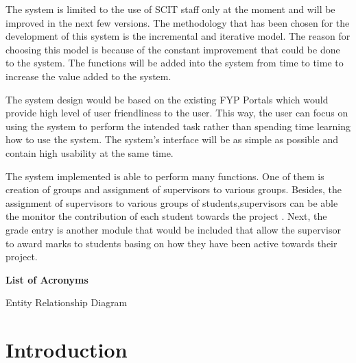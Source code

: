 \documentclass{article}
\begin{document}
\vspace*{8mm}
\par The system is limited to the use of SCIT staff only at the moment and will be improved in the next few versions. The methodology that has been chosen for the development of this system is the incremental and iterative model. The reason for choosing this model is because of the constant improvement that could be done to the system. The functions will be added into the system from time to time to increase the value added to the system.
\vspace*{8mm}
\par The system design would be based on the existing FYP Portals which would provide high level of user friendliness to the user. This way, the user can focus on using the system to perform the intended task rather than spending time learning how to use the system. The system’s interface will be as simple as possible and contain high usability at the same time.
\vspace*{8mm}
\par The system implemented is able to perform many functions. One of them is creation of groups and assignment of supervisors to various groups. Besides, the assignment of supervisors to various groups of students,supervisors can be able the monitor the contribution of each student towards the project . Next, the grade entry is another module that would be included that allow the supervisor to award marks to students basing on how they have been active towards their project.
\newpage
\tableofcontents
\clearpage
\newpage
\listoffigures
\newpage
\listoftables
\newpage
\textbf{List of Acronyms}\\
\begin{acronym}
 { Entity Relationship Diagram}
\end{acronym}
\clearpage
{}
\newpage
\setcounter{page}{1}
\section{Introduction}
\end{document}
